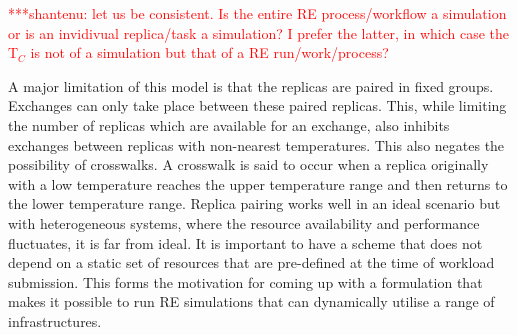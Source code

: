 \documentclass{rspublic}
\newcommand{\jhanote}[1]{ {\textcolor{red} { ***shantenu: #1 }}}
\newcommand{\jhanote}[1]{}
\begin{document}






\jhanote{let us be consistent. Is the entire RE process/workflow a  simulation or is an invidivual replica/task a simulation? I prefer  the latter, in which case the T$_C$ is not of a simulation but that  of a RE run/work/process?}  

 
A major limitation of this model is that the replicas are paired in
fixed groups.  Exchanges can only take place between these paired
replicas.  This, while limiting the number of replicas which are
available for an exchange, also inhibits exchanges between replicas
with non-nearest temperatures. This also negates the possibility of
crosswalks. A crosswalk is said to occur when a replica originally
with a low temperature reaches the upper temperature range and then
returns to the lower temperature
range. %
Replica pairing works well in an ideal scenario but with heterogeneous
systems, where the resource availability and performance fluctuates,
it is far from ideal. It is important to have a scheme that does not
depend on a static  set of
resources that are pre-defined at the time of workload submission.
This forms the motivation for coming up with a formulation that makes
it possible to run RE simulations that can dynamically utilise a range
of infrastructures.
\end{document}
